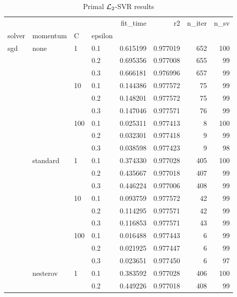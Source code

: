 \begin{table}[H]
\centering
\caption{Primal $\protect \mathcal{L}_2$-SVR results}
\label{primal_l2_svr_cv_results}
\begin{tabular}{llllrrrr}
\toprule
          &   &     &     &  fit\_time &        r2 &  n\_iter &  n\_sv \\
solver & momentum & C & epsilon &           &           &         &       \\
\midrule
sgd & none & 1   & 0.1 &  0.615199 &  0.977019 &     652 &   100 \\
          &   &     & 0.2 &  0.695356 &  0.977008 &     655 &    99 \\
          &   &     & 0.3 &  0.666181 &  0.976996 &     657 &    99 \\
          &   & 10  & 0.1 &  0.144386 &  0.977572 &      75 &    99 \\
          &   &     & 0.2 &  0.148201 &  0.977572 &      75 &    99 \\
          &   &     & 0.3 &  0.147046 &  0.977571 &      76 &    99 \\
          &   & 100 & 0.1 &  0.025311 &  0.977413 &       8 &   100 \\
          &   &     & 0.2 &  0.032301 &  0.977418 &       9 &    99 \\
          &   &     & 0.3 &  0.038598 &  0.977423 &       9 &    98 \\
          & standard & 1   & 0.1 &  0.374330 &  0.977028 &     405 &   100 \\
          &   &     & 0.2 &  0.435667 &  0.977018 &     407 &    99 \\
          &   &     & 0.3 &  0.446224 &  0.977006 &     408 &    99 \\
          &   & 10  & 0.1 &  0.093759 &  0.977572 &      42 &    99 \\
          &   &     & 0.2 &  0.114295 &  0.977571 &      42 &    99 \\
          &   &     & 0.3 &  0.116853 &  0.977571 &      43 &    99 \\
          &   & 100 & 0.1 &  0.016488 &  0.977443 &       6 &    99 \\
          &   &     & 0.2 &  0.021925 &  0.977447 &       6 &    99 \\
          &   &     & 0.3 &  0.023651 &  0.977450 &       6 &    97 \\
          & nesterov & 1   & 0.1 &  0.383592 &  0.977028 &     406 &   100 \\
          &   &     & 0.2 &  0.449226 &  0.977018 &     408 &    99 \\

\end{tabular}
\end{table}
